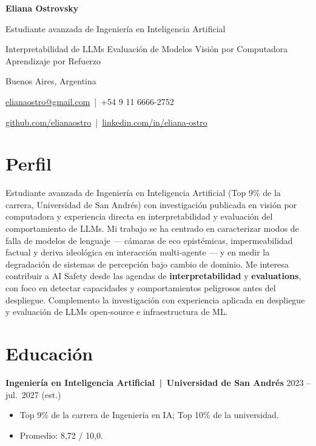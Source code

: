 \documentclass[a4paper,11pt]{article}
\begin{document}
{\LARGE\bfseries Eliana Ostrovsky}\par\smallskip
{\large Estudiante avanzada de Ingeniería en Inteligencia Artificial}\par\smallskip
Interpretabilidad de LLMs \textbullet{} Evaluación de Modelos \textbullet{} Visión por Computadora \textbullet{} Aprendizaje por Refuerzo\par
\smallskip
Buenos Aires, Argentina\par
\href{mailto:elianaostro@gmail.com}{elianaostro@gmail.com} \,|\, +54 9 11 6666-2752\par
\href{https://github.com/elianaostro}{github.com/elianaostro} \,|\, \href{https://linkedin.com/in/eliana-ostro}{linkedin.com/in/eliana-ostro}

\medskip

\section*{Perfil}

Estudiante avanzada de Ingeniería en Inteligencia Artificial (Top 9\% de la carrera, Universidad de San Andrés) con investigación publicada en visión por computadora y experiencia directa en interpretabilidad y evaluación del comportamiento de LLMs. Mi trabajo se ha centrado en caracterizar modos de falla de modelos de lenguaje --- cámaras de eco epistémicas, impermeabilidad factual y deriva ideológica en interacción multi-agente --- y en medir la degradación de sistemas de percepción bajo cambio de dominio. Me interesa contribuir a AI Safety desde las agendas de \textbf{interpretabilidad} y \textbf{evaluations}, con foco en detectar capacidades y comportamientos peligrosos antes del despliegue. Complemento la investigación con experiencia aplicada en despliegue y evaluación de LLMs open-source e infraestructura de ML.

\section*{Educación}

\textbf{Ingeniería en Inteligencia Artificial \,|\, Universidad de San Andrés} \hfill 2023 -- jul.\ 2027 (est.)
\begin{itemize}
    \item Top 9\% de la carrera de Ingeniería en IA; Top 10\% de la universidad.
    \item Promedio: 8,72 / 10,0.
\end{itemize}
\end{document}
